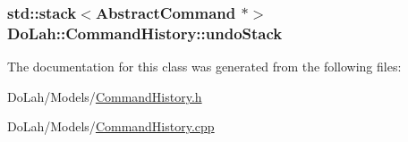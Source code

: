 \subsubsection[{undo\+Stack}]{\setlength{\rightskip}{0pt plus 5cm}std\+::stack$<${\bf Abstract\+Command} $\ast$$>$ Do\+Lah\+::\+Command\+History\+::undo\+Stack\hspace{0.3cm}{\ttfamily [private]}}\label{class_do_lah_1_1_command_history_a73a9d3c5e02fd12e19f4bf23b364c7d0}


The documentation for this class was generated from the following files\+:\begin{DoxyCompactItemize}
\item 
Do\+Lah/\+Models/\hyperlink{_command_history_8h}{Command\+History.\+h}\item 
Do\+Lah/\+Models/\hyperlink{_command_history_8cpp}{Command\+History.\+cpp}\end{DoxyCompactItemize}
